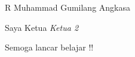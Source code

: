 \documentclass{article}
\begin{document}
R Muhammad Gumilang Angkasa

Saya Ketua \emph{Ketua 2}

Semoga lancar belajar \LaTex !!
\end{document}
